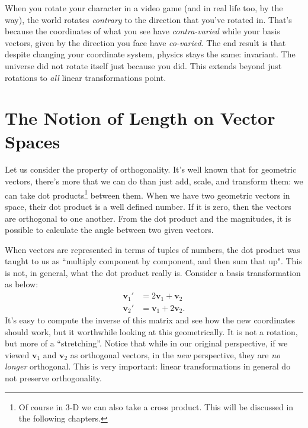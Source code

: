 	
	 When you rotate your character in a video game (and in real life too, by the way), the world rotates \emph{contrary} to the direction that you've rotated in. That's because the coordinates of what you see have \emph{contra-varied} while your basis vectors, given by the direction you face have \emph{co-varied}. The end result is that despite changing your coordinate system, physics stays the same: invariant. The universe did not rotate itself just because you did. This extends beyond just rotations to \emph{all} linear transformations point. \\
	
	
	\section{The Notion of Length on Vector Spaces} %
	\label{sec:the_notion_of_length_on_vector_spaces}
	
	Let us consider the property of orthogonality. It's well known that for geometric vectors, there's more that we can do than just add, scale, and transform them: we can take dot products\footnote{Of course in 3-D we can also take a cross product. This will be discussed in the following chapters.} between them. When we have two geometric vectors in space, their dot product is a well defined number. If it is zero, then the vectors are orthogonal to one another. From the dot product and the magnitudes, it is possible to calculate the angle between two given vectors. 
	
	When vectors are represented in terms of tuples of numbers, the dot product was taught to us as ``multiply component by component, and then sum that up". This is not, in general, what the dot product really is. Consider a basis transformation as below:
	\begin{align*}
		\mathbf v_1' &= 2 \mathbf v_1 + \mathbf v_2 \\
		\mathbf v_2' &=  \mathbf v_1 + 2 \mathbf v_2.
	\end{align*}
	It's easy to compute the inverse of this matrix and see how the new coordinates should work, but it worthwhile looking at this geometrically. It is not a rotation, but more of a ``stretching''. Notice that while in our original perspective, if we viewed $\mathbf v_1$ and $\mathbf v_2$ as orthogonal vectors, in the \emph{new} perspective, they are \emph{no longer} orthogonal. This is very important: linear transformations in general do not preserve orthogonality.
	
